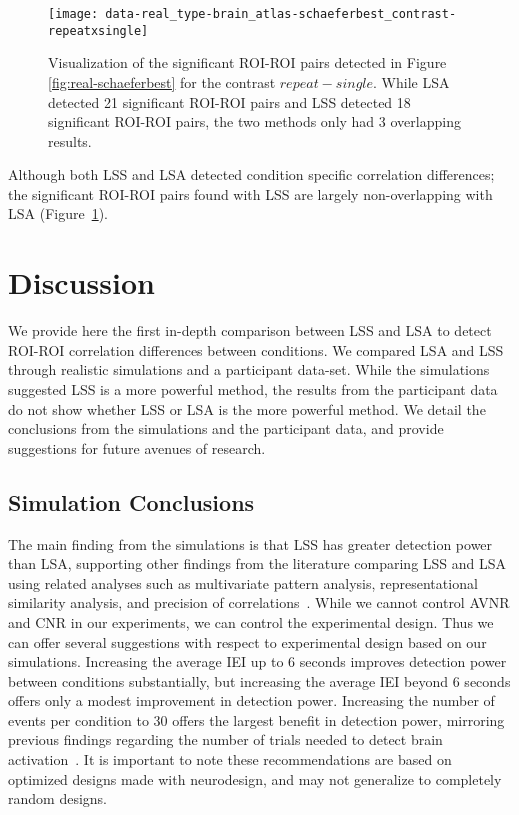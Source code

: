 \documentclass[phd,appendix,figures]{uithesis}
\begin{document}
\begin{figure}[H]
  \centering
  \texttt{[image: 
    data-real\_type-brain\_atlas-schaeferbest\_contrast-repeatxsingle]}
  \caption[SchaeferTop20 atlas, real data, repeat - single]{
    Visualization of the significant ROI-ROI pairs detected in Figure \ref{fig:real-schaeferbest}
    for the contrast $repeat - single$.
    While LSA detected 21 significant ROI-ROI pairs and LSS detected 18 significant
    ROI-ROI pairs, the two methods only had 3 overlapping results.
  }
\label{fig:non-overlap}
\end{figure}

Although both LSS and LSA detected condition specific correlation differences;
the significant ROI-ROI pairs found with LSS are largely non-overlapping with LSA (Figure~\ref{fig:non-overlap}).

\section{Discussion}
\label{discussion}

We provide here the first in-depth comparison between LSS and LSA to detect 
ROI-ROI correlation differences between conditions.
We compared LSA and LSS through realistic simulations and a participant data-set.
While the simulations suggested LSS is a more powerful method,
the results from the participant data do not show whether LSS or LSA is the more powerful method.
We detail the conclusions from the simulations and the participant data, and provide
suggestions for future avenues of research.

\subsection*{Simulation Conclusions}
\label{discussion:simulation-conclusions}

The main finding from the simulations is that LSS has greater detection power than LSA,
supporting other findings from the literature comparing LSS and LSA using related analyses such as
multivariate pattern analysis, representational similarity analysis, and precision of correlations~\cite{Mumford2012,Mumford2014a,Abdulrahman2016,Turner2012a}.
While we cannot control AVNR and CNR in our experiments, we can control the experimental design.
Thus we can offer several suggestions with respect to experimental design based on our simulations.
Increasing the average IEI up to 6 seconds improves detection power between conditions substantially,
but increasing the average IEI beyond 6 seconds offers only a modest improvement in detection power.
Increasing the number of events per condition to 30 offers the largest benefit in detection power,
mirroring previous findings regarding the number of trials needed to detect brain activation~\cite{Huettel2001}.
It is important to note these recommendations are based on optimized designs made with neurodesign,
and may not generalize to completely random designs.
\end{document}

